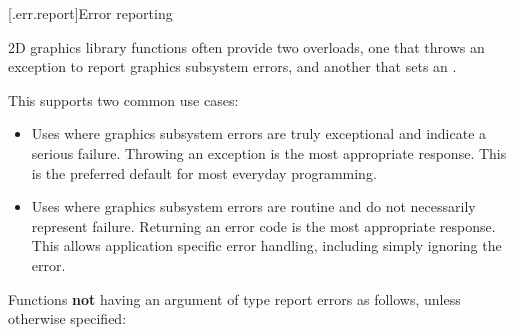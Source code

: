 [\iotwod.err.report]{Error reporting}

\pnum
2D graphics library functions often provide two overloads, one that throws an exception to report graphics subsystem errors, and another that sets an .

\pnum
\enternote
This supports two common use cases:

\begin{itemize}
\item Uses where graphics subsystem errors are truly exceptional and indicate a serious failure. Throwing an exception is the most appropriate response. This is the preferred default for most everyday programming.

\item Uses where graphics subsystem errors are routine and do not necessarily represent failure. Returning an error code is the most appropriate response. This allows application specific error handling, including simply ignoring the error.
\end{itemize}

\exitnote

\pnum
Functions \textbf{not} having an argument of type  report errors as follows, unless otherwise specified:

